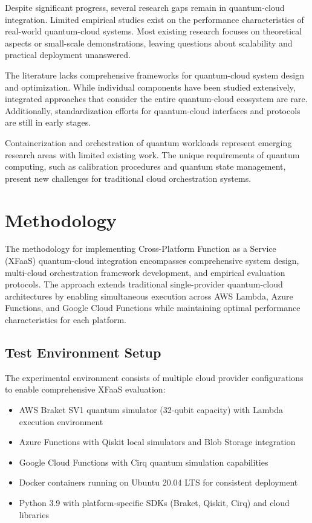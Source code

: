 \documentclass[onecolumn]{IEEEtran}
\begin{document}
Despite significant progress, several research gaps remain in quantum-cloud integration. Limited empirical studies exist on the performance characteristics of real-world quantum-cloud systems. Most existing research focuses on theoretical aspects or small-scale demonstrations, leaving questions about scalability and practical deployment unanswered.

The literature lacks comprehensive frameworks for quantum-cloud system design and optimization. While individual components have been studied extensively, integrated approaches that consider the entire quantum-cloud ecosystem are rare. Additionally, standardization efforts for quantum-cloud interfaces and protocols are still in early stages.

Containerization and orchestration of quantum workloads represent emerging research areas with limited existing work. The unique requirements of quantum computing, such as calibration procedures and quantum state management, present new challenges for traditional cloud orchestration systems.

\section{Methodology}

The methodology for implementing Cross-Platform Function as a Service (XFaaS) quantum-cloud integration encompasses comprehensive system design, multi-cloud orchestration framework development, and empirical evaluation protocols. The approach extends traditional single-provider quantum-cloud architectures by enabling simultaneous execution across AWS Lambda, Azure Functions, and Google Cloud Functions while maintaining optimal performance characteristics for each platform.

\subsection{Test Environment Setup}

The experimental environment consists of multiple cloud provider configurations to enable comprehensive XFaaS evaluation:
\begin{itemize}
    \item AWS Braket SV1 quantum simulator (32-qubit capacity) with Lambda execution environment
    \item Azure Functions with Qiskit local simulators and Blob Storage integration
    \item Google Cloud Functions with Cirq quantum simulation capabilities
    \item Docker containers running on Ubuntu 20.04 LTS for consistent deployment
    \item Python 3.9 with platform-specific SDKs (Braket, Qiskit, Cirq) and cloud libraries
\end{itemize}
\end{document}
